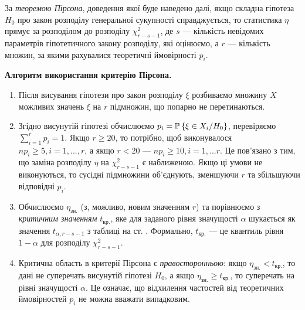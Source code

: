 За \emph{теоремою Пірсона}, доведення якої буде наведено далі, якщо складна гіпотеза $H_0$ про закон розподілу генеральної сукупності 
справджується, то статистика $\eta$ прямує за розподілом до розподілу $\chi^2_{r-s-1}$, де $s$ --- кількість невідомих параметрів гіпотетичного закону розподілу,
які оцінюємо, а $r$ --- кількість множин, за якими рахувалися теоретичні ймовірності $p_i$.

\textbf{Алгоритм використання критерію Пірсона.}
\begin{enumerate}
    \item Після висування гіпотези про закон розподілу $\xi$ розбиваємо множину $X$ можливих значень $\xi$ на $r$ підмножин, що попарно не перетинаються.
    \item Згідно висунутій гіпотезі обчислюємо $p_i = \P\left\{\xi \in X_i / H_0 \right\}$, перевіряємо $\sum\limits_{i=1}^r p_i = 1$.
    Якщо $r\geq 20$, то потрібно, щоб виконувалося $n p_i \geq 5, i = 1, ..., r$, а якщо $r<20$ --- $n p_i \geq 10, i = 1, ... r$. Це пов'язано з тим, що
    заміна розподілу $\eta$ на $\chi^2_{r-s-1}$ є наближеною. Якщо ці умови не виконуються, то сусідні підмножини об'єднують, зменшуючи $r$ та збільшуючи відповідні $p_i$.
    \item Обчислюємо $\eta_{\text{зн.}}$ (з, можливо, новим значенням $r$) та порівнюємо з \emph{критичним значенням} $t_{\text{кр.}}$, яке для заданого рівня значущості $\alpha$
    шукається як значення $t_{\alpha, r-s-1}$ з таблиці на ст. \pageref{tabel:chi_2}. Формально, $t_{\text{кр.}}$ --- це квантиль рівня $1-\alpha$ для розподілу $\chi^2_{r-s-1}$.
    \item Критична область в критерії Пірсона є \emph{правосторонньою}: якщо $\eta_{\text{зн.}} < t_{\text{кр.}}$, то дані не суперечать висунутій гіпотезі $H_0$, а якщо
    $\eta_{\text{зн.}} \geq t_{\text{кр.}}$, то суперечать на рівні значущості $\alpha$. Це означає, що відхилення частостей від теоретичних ймовірностей $p_i$ не можна вважати випадковим.
\end{enumerate}

